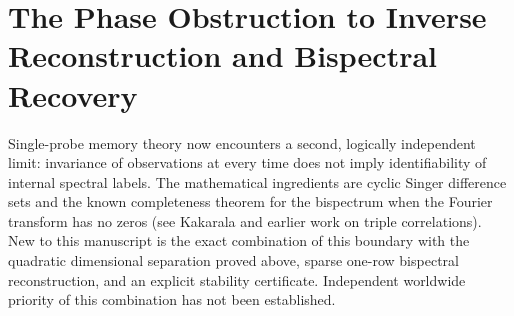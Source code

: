 \documentclass[11pt,a4paper,oneside]{book}
\begin{document}
\chapter{The Phase Obstruction to Inverse Reconstruction and Bispectral Recovery}
Single-probe memory theory now encounters a second, logically independent limit: invariance of observations at every time does not imply identifiability of internal spectral labels. The mathematical ingredients are cyclic Singer difference sets and the known completeness theorem for the bispectrum when the Fourier transform has no zeros (see Kakarala and earlier work on triple correlations). New to this manuscript is the exact combination of this boundary with the quadratic dimensional separation proved above, sparse one-row bispectral reconstruction, and an explicit stability certificate. Independent worldwide priority of this combination has not been established.
\end{document}
